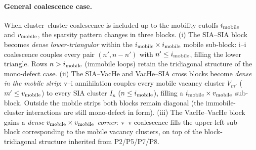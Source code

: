 \documentclass[pdflatex,sn-basic]{sn-jnl} %
\begin{document}
\paragraph{General coalescence case.}
When cluster--cluster coalescence is included up to the mobility
cutoffs $i_{\rm mobile}$ and $v_{\rm mobile}$, the sparsity pattern changes
in three blocks. (i) The SIA--SIA block becomes
\emph{dense lower-triangular} within the $i_{\rm mobile} \times i_{\rm mobile}$
mobile sub-block: i--i coalescence couples every pair $(n', n-n')$ with
$n' \leq i_{\rm mobile}$, filling the lower triangle. Rows $n > i_{\rm mobile}$
(immobile loops) retain the tridiagonal structure of the mono-defect
case. (ii) The SIA--VacHe and VacHe--SIA cross blocks become \emph{dense
in the mobile strip}: v--i annihilation couples every mobile vacancy
cluster $V_{m'}$ ($m' \leq v_{\rm mobile}$) to every SIA cluster $I_n$
($n \leq i_{\rm mobile}$), filling a $i_{\rm mobile} \times v_{\rm mobile}$
sub-block. Outside the mobile strips both blocks remain diagonal (the
immobile-cluster interactions are still mono-defect in form). (iii) The
VacHe--VacHe block gains a \emph{dense $v_{\rm mobile} \times v_{\rm mobile}$
corner}: v--v coalescence fills the upper-left sub-block corresponding
to the mobile vacancy clusters, on top of the block-tridiagonal
structure inherited from P2/P5/P7/P8.




\end{document}
